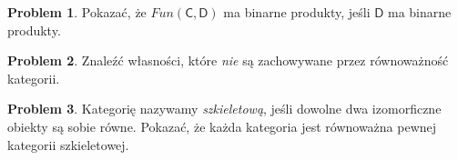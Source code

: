 \documentclass[9pt]{amsart}
\theoremstyle{plain}
\theoremstyle{definition}
\newtheorem{problem}{Problem}
\numberwithin{equation}{section}
\begin{document}

\begin{problem}
Pokazać, że $Fun(\mathsf{C},\mathsf{D})$ ma binarne produkty, jeśli $\mathsf{D}$ ma binarne produkty.
\end{problem}

\begin{problem}
Znaleźć własności, które \emph{nie} są zachowywane przez równoważność kategorii.
\end{problem}

\begin{problem}
Kategorię nazywamy \emph{szkieletową}, jeśli dowolne dwa izomorficzne obiekty są sobie równe. Pokazać, że każda kategoria jest równoważna pewnej kategorii szkieletowej. 
\end{problem}
\end{document}
